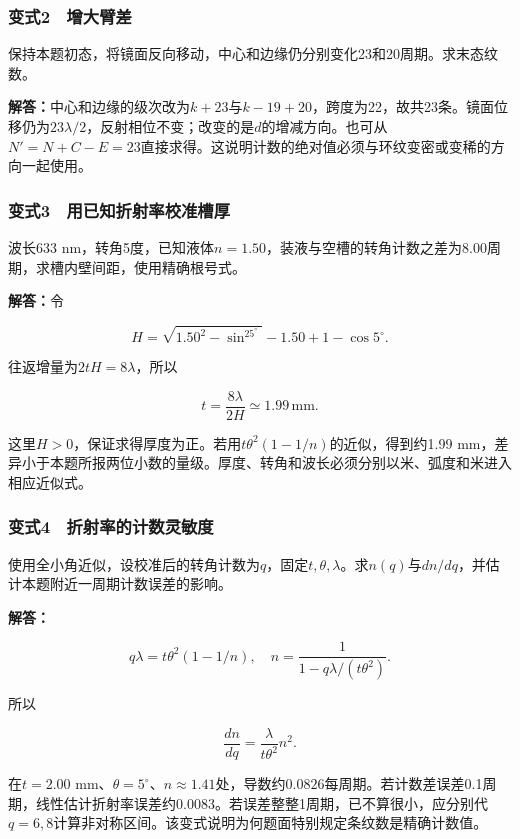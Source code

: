 \documentclass[12pt,a4paper,fontset=fandol]{ctexart}
\begin{document}
\subsubsection{变式2　增大臂差}\label{ux53d8ux5f0f2-ux589eux5927ux81c2ux5dee}

保持本题初态，将镜面反向移动，中心和边缘仍分别变化23和20周期。求末态纹数。

\textbf{解答：}中心和边缘的级次改为\(k+23\)与\(k-19+20\)，跨度为22，故共23条。镜面位移仍为\(23\lambda/2\)，反射相位不变；改变的是\(d\)的增减方向。也可从\(N'=N+C-E=23\)直接求得。这说明计数的绝对值必须与环纹变密或变稀的方向一起使用。

\subsubsection{变式3　用已知折射率校准槽厚}\label{ux53d8ux5f0f3-ux7528ux5df2ux77e5ux6298ux5c04ux7387ux6821ux51c6ux69fdux539a}

波长633
nm，转角5度，已知液体\(n=1.50\)，装液与空槽的转角计数之差为8.00周期，求槽内壁间距，使用精确根号式。

\textbf{解答：}令

\[
H=\sqrt{1.50^2-\sin^25^\circ}-1.50
+1-\cos5^\circ.
\]

往返增量为\(2tH=8\lambda\)，所以

\[
t=\frac{8\lambda}{2H}\simeq1.99\,\mathrm{mm}.
\]

这里\(H>0\)，保证求得厚度为正。若用\(t\theta^2(1-1/n)\)的近似，得到约1.99
mm，差异小于本题所报两位小数的量级。厚度、转角和波长必须分别以米、弧度和米进入相应近似式。

\subsubsection{变式4　折射率的计数灵敏度}\label{ux53d8ux5f0f4-ux6298ux5c04ux7387ux7684ux8ba1ux6570ux7075ux654fux5ea6}

使用全小角近似，设校准后的转角计数为\(q\)，固定\(t,\theta,\lambda\)。求\(n(q)\)与\(dn/dq\)，并估计本题附近一周期计数误差的影响。

\textbf{解答：}

\[
q\lambda=t\theta^2(1-1/n),
\quad
n=\frac1{1-q\lambda/(t\theta^2)}.
\]

所以

\[
\frac{dn}{dq}=\frac{\lambda}{t\theta^2}n^2.
\]

在\(t=2.00\)
mm、\(\theta=5^\circ\)、\(n\approx1.41\)处，导数约\(0.0826\)每周期。若计数差误差0.1周期，线性估计折射率误差约0.0083。若误差整整1周期，已不算很小，应分别代\(q=6,8\)计算非对称区间。该变式说明为何题面特别规定条纹数是精确计数值。
\end{document}
